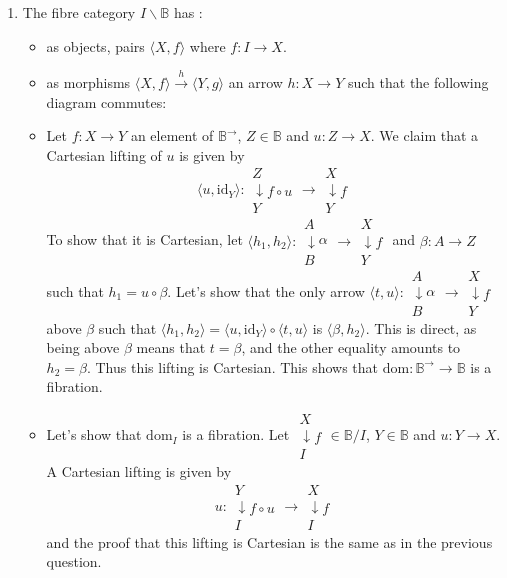 \documentclass{report}
\newcommand{\bB}[0]{\mathbb B}
\newcommand{\fib}[3]{\begin{array}{l}#1 \\[-0.1cm] \downarrow #2 \\ #3\end{array}}
\newcommand{\idd}[0]{\mathrm{id}}
\renewcommand{\dom}[0]{\mathrm{dom}}
\begin{document}
\begin{answer}
    \begin{enumerate}[label=(\roman*)]
        \item The fibre category $I\backslash \bB$ has :
        \begin{itemize}
            \item as objects, pairs $\langle X,f\rangle$ where $f : I \to X$.
            \item as morphisms $\langle X,f\rangle \xrightarrow{h} \langle Y,g\rangle$ an arrow $h : X \to Y$
            such that the following diagram commutes:
            \begin{center}
            \end{center}
            \item Let $f : X \to Y$ an element of $\bB^\to$, $Z \in \bB$ and $u : Z \to X$. We claim that a
            Cartesian lifting of $u$ is given by
            $$\langle u , \idd_Y\rangle : \fib{Z}{f\circ u}{Y}\longrightarrow\fib{X}{f}{Y}$$
            To show that it is Cartesian, let $\langle h_1,h_2\rangle : \fib{A}{\alpha}{B} \longrightarrow
            \fib{X}{f}{Y}$ and $\beta : A \to Z$ such that $h_1 = u\circ \beta$. Let's show that the only
            arrow $\langle t,u\rangle : \fib{A}{\alpha}{B}\longrightarrow\fib{X}{f}{Y}$ above $\beta$ such
            that $\langle h_1,h_2\rangle = \langle u,\idd_Y\rangle \circ \langle t,u\rangle$ is
            $\langle \beta,h_2\rangle$. This is direct, as being above $\beta$ means that $t = \beta$, and
            the other equality amounts to $h_2 = \beta$. Thus this lifting is Cartesian. This shows that
            $\dom : \bB^\to\to\bB$ is a fibration.
            \item Let's show that $\dom_I$ is a fibration. Let $\fib{X}{f}{I} \in \bB/I$, $Y\in \bB$ and
            $u : Y \to X$. A Cartesian lifting is given by
            $$u : \fib{Y}{f\circ u}{I}\longrightarrow \fib{X}{f}{I}$$
            and the proof that this lifting is Cartesian is the same as in the previous question.
        \end{itemize}
    \end{enumerate}
\end{answer}
\end{document}
